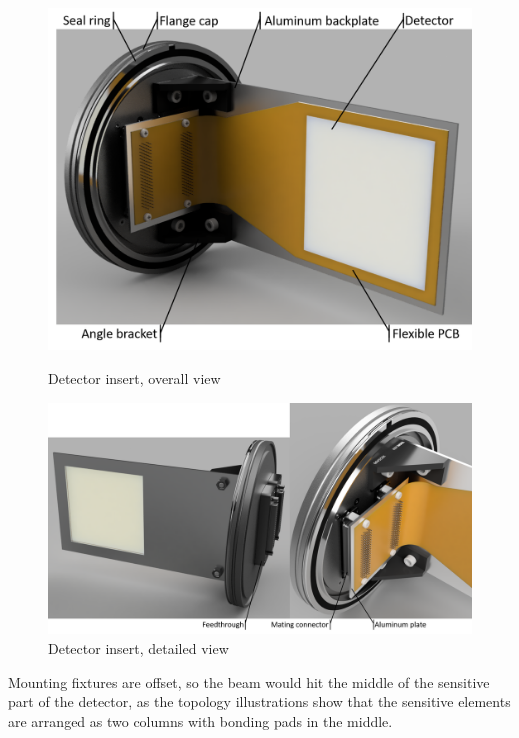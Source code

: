\documentclass[a4paper]{jpconf}
\begin{document}
\begin{figure}[htbp]
	\begin{minipage}{14pc}
		\includegraphics[width=\textwidth]{detector_insert.png}
		\caption{\label{fig:3} Detector insert, overall view}
	\end{minipage}\hspace{2pc}
	\begin{minipage}{14pc}
		\includegraphics[width=1.5\textwidth]{detector_insert_back.png}
		\caption{\label{fig:4} Detector insert, detailed view}
	\end{minipage} 
\end{figure}

Mounting fixtures are offset, so the beam would hit the middle of the sensitive part of the detector, as the topology illustrations show that the sensitive elements are arranged as two columns with bonding pads in the middle.
\end{document}

